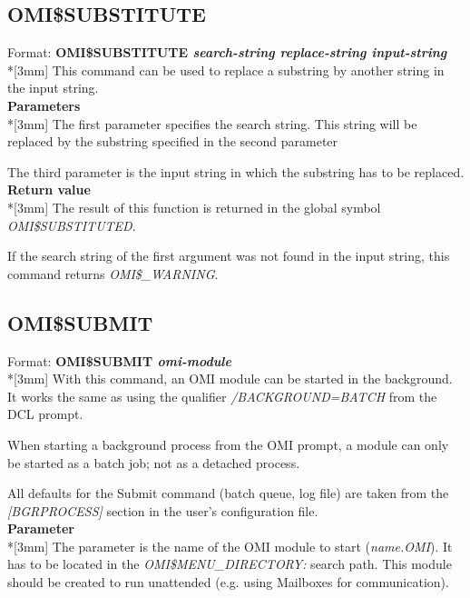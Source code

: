 \documentclass[a4paper]{book}
\renewcommand{\indent}{\hspace*{5mm}}
\begin{document}
\subsection{OMI{\$}SUBSTITUTE}
\label{subsubsec:mylabel62}

\indent Format: \textbf{OMI{\$}SUBSTITUTE \textit{search-string replace-string input-string}}\\*[3mm]
This command can be used to replace a substring by another string in the 
input string.\\[3mm]
\textbf{Parameters}\\*[3mm]
The first parameter specifies the search string. This string will be 
replaced by the substring specified in the second parameter

The third parameter is the input string in which the substring has to be 
replaced.\\[3mm]
\textbf{Return value}\\*[3mm]
The result of this function is returned in the global symbol 
\textsl{OMI{\$}SUBSTITUTED}.

If the search string of the first argument was not found in the input 
string, this command returns \textsl{OMI{\$}{\_}WARNING}.

\subsection{OMI{\$}SUBMIT}
\label{subsubsec:mylabel63}

\indent Format: \textbf{OMI{\$}SUBMIT \textit{omi-module}}\\*[3mm]
With this command, an OMI module can be started in the background. It works 
the same as using the qualifier \textsl{/BACKGROUND=BATCH} from the DCL 
prompt.

When starting a background process from the OMI prompt, a module can only be 
started as a batch job; not as a detached process. 

All defaults for the Submit command (batch queue, log file) are taken from 
the \textsl{[BGRPROCESS]} section in the user's configuration file.\\[3mm]
\textbf{Parameter}\\*[3mm]
The parameter is the name of the OMI module to start (\textsl{\textit{name}.OMI}). It has to be 
located in the \textsl{OMI{\$}MENU{\_}DIRECTORY:} search path. This module should be 
created to run unattended (e.g. using Mailboxes for communication).
\end{document}
